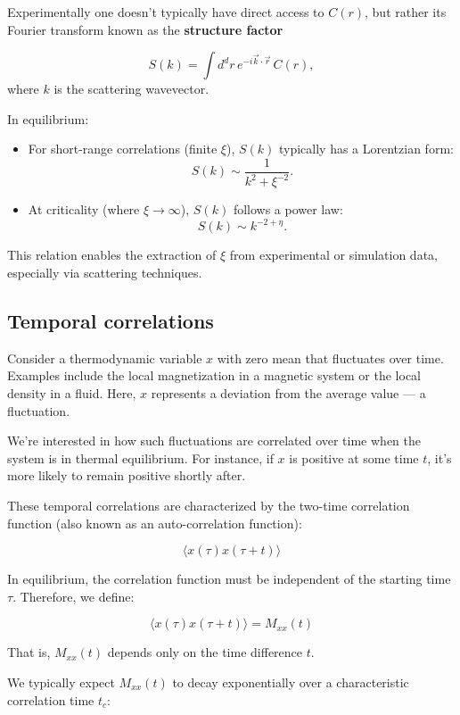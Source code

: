 \documentclass[
  letterpaper,
  enabledeprecatedfontcommands]{report}
\begin{document}
Experimentally one doesn't typically have direct access to \(C(r)\), but
rather its Fourier transform known as the \textbf{structure factor}

\[
S(k) = \int d^d r \, e^{-i \vec{k} \cdot \vec{r}} \, C(r),
\] where \(k\) is the scattering wavevector.

In equilibrium:

\begin{itemize}
\item
  For short-range correlations (finite \(\xi\)), \(S(k)\) typically has
  a Lorentzian form: \[
  S(k) \sim \frac{1}{k^2 + \xi^{-2}}.
  \]
\item
  At criticality (where \(\xi \to \infty\)), \(S(k)\) follows a power
  law: \[
  S(k) \sim k^{-2 + \eta}.
  \]
\end{itemize}

This relation enables the extraction of \(\xi\) from experimental or
simulation data, especially via scattering techniques.

\subsection{Temporal correlations}\label{temporal-correlations}

Consider a thermodynamic variable \(x\) with zero mean that fluctuates
over time. Examples include the local magnetization in a magnetic system
or the local density in a fluid. Here, \(x\) represents a deviation from
the average value --- a fluctuation.

We're interested in how such fluctuations are correlated over time when
the system is in thermal equilibrium. For instance, if \(x\) is positive
at some time \(t\), it's more likely to remain positive shortly after.

These temporal correlations are characterized by the two-time
correlation function (also known as an auto-correlation function):

\[
\langle x(\tau) x(\tau + t) \rangle
\]

In equilibrium, the correlation function must be independent of the
starting time \(\tau\). Therefore, we define:

\[
\langle x(\tau) x(\tau + t) \rangle = M_{xx}(t)
\]

That is, \(M_{xx}(t)\) depends only on the time difference \(t\).

We typically expect \(M_{xx}(t)\) to decay exponentially over a
characteristic correlation time \(t_c\):
\end{document}

